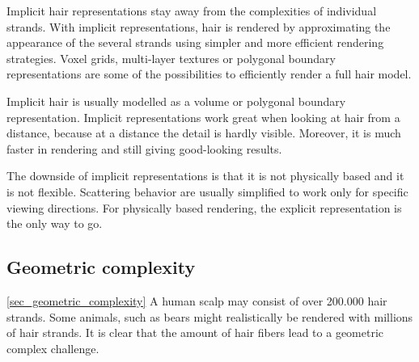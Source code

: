 \documentclass[11pt,a4paper]{report}
\begin{document}
Implicit hair representations stay away from the complexities of individual strands. With implicit representations, hair is rendered by approximating the appearance of the several strands using simpler and more efficient rendering strategies. Voxel grids, multi-layer textures or polygonal boundary representations are some of the possibilities to efficiently render a full hair model.

Implicit hair is usually modelled as a volume or polygonal boundary representation. Implicit representations work great when looking at hair from a distance, because at a distance the detail is hardly visible. Moreover, it is much faster in rendering and still giving good-looking results.









The downside of implicit representations is that it is not physically based and it is not flexible. Scattering behavior are usually simplified to work only for specific viewing directions. For physically based rendering, the explicit representation is the only way to go.

\subsection{Geometric complexity}
\ref{sec_geometric_complexity}
A human scalp may consist of over 200.000 hair strands. Some animals, such as bears might realistically be rendered with millions of hair strands. It is clear that the amount of hair fibers lead to a geometric complex challenge. 
\end{document}
